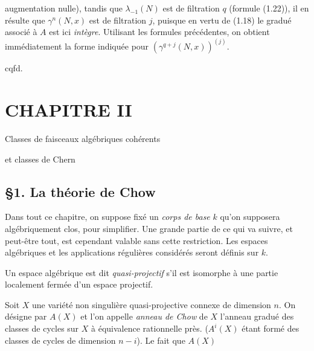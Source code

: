 augmentation nulle), tandis que $\lambda_{-1}(N)$ est de filtration $q$ (formule (1.22)), il en résulte que $\gamma^n(N,x)$ est de filtration $j$, puisque en vertu de (1.18) le gradué associé à $A$ est ici \emph{intègre}. Utilisant les formules précédentes, on obtient immédiatement la forme indiquée pour $(\gamma^{q+j}(N,x))^{(j)}$.
\begin{flushright}cqfd.\end{flushright}

\section*{CHAPITRE II}
\begin{center}
Classes de faisceaux algébriques cohérents\par
et classes de Chern
\end{center}

\subsection*{\S 1. La théorie de Chow}

Dans tout ce chapitre, on suppose fixé un \emph{corps de base} $k$ qu'on supposera algébriquement clos, pour simplifier. Une grande partie de ce qui va suivre, et peut-être tout, est cependant valable sans cette restriction. Les espaces algébriques et les applications régulières considérés seront définis sur $k$.

Un espace algébrique est dit \emph{quasi-projectif} s'il est isomorphe à une partie localement fermée d'un espace projectif.

Soit $X$ une variété non singulière quasi-projective connexe de dimension $n$. On désigne par $A(X)$ et l'on appelle \emph{anneau de Chow} de $X$ l'anneau gradué des classes de cycles sur $X$ à équivalence rationnelle près. ($A^i(X)$ étant formé des classes de cycles de dimension $n-i$). Le fait que $A(X)$
